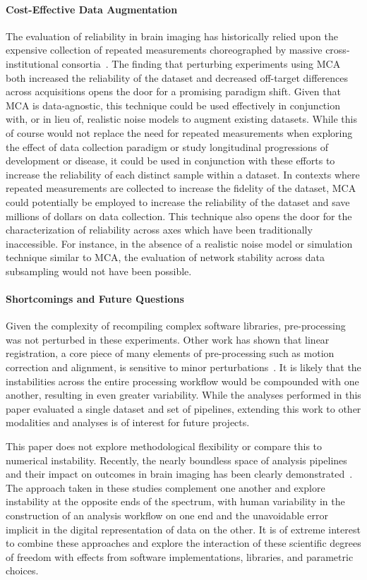 \documentclass[fleqn,10pt]{SelfArx} %
\begin{document}
\paragraph{Cost-Effective Data Augmentation}
The evaluation of reliability in brain imaging has historically relied upon the expensive collection of repeated
measurements choreographed by massive cross-institutional consortia~\cite{van2013wu,zuo2014open}. The finding that
perturbing experiments using MCA both increased the reliability of the dataset and decreased off-target differences
across acquisitions opens the door for a promising paradigm shift. Given that MCA is data-agnostic, this technique
could be used effectively in conjunction with, or in lieu of, realistic noise models to augment existing datasets.
While this of course would not replace the need for repeated measurements when exploring the effect of data collection
paradigm or study longitudinal progressions of development or disease, it could be used in conjunction with these
efforts to increase the reliability of each distinct sample within a dataset. In contexts where repeated measurements
are collected to increase the fidelity of the dataset, MCA could potentially be employed to increase the reliability of
the dataset and save millions of dollars on data collection. This technique also opens the door for the
characterization of reliability across axes which have been traditionally inaccessible. For instance, in the absence of
a realistic noise model or simulation technique similar to MCA, the evaluation of network stability across data
subsampling would not have been possible.

\paragraph{Shortcomings and Future Questions}
Given the complexity of recompiling complex software libraries, pre-processing was not perturbed in these experiments.
Other work has shown that linear registration, a core piece of many elements of pre-processing such as motion
correction and alignment, is sensitive to minor perturbations~\cite{Glatard2015-vc}. It is likely that the
instabilities across the entire processing workflow would be compounded with one another, resulting in even greater
variability. While the analyses performed in this paper evaluated a single dataset and set of pipelines, extending this
work to other modalities and analyses is of interest for future projects.

This paper does not explore methodological flexibility or compare this to numerical instability. Recently, the nearly
boundless space of analysis pipelines and their impact on outcomes in brain imaging has been clearly
demonstrated~\cite{botvinik2020variability}. The approach taken in these studies complement one another and explore
instability at the opposite ends of the spectrum, with human variability in the construction of an analysis workflow on
one end and the unavoidable error implicit in the digital representation of data on the other. It is of extreme
interest to combine these approaches and explore the interaction of these scientific degrees of freedom with effects
from software implementations, libraries, and parametric choices.
\end{document}
